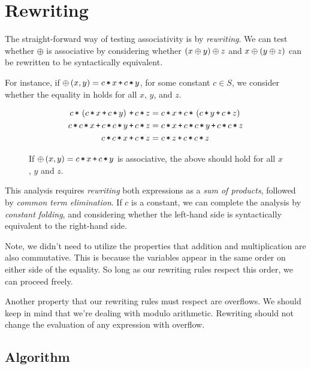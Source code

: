 
\section{Rewriting}

The straight-forward way of testing associativity is by \emph{rewriting}. We
can test whether $\oplus$ is associative by considering whether $\left({x \oplus y}\right)
\oplus z$ and $x \oplus \left({y \oplus z}\right)$ can be rewritten to be syntactically
equivalent.

For instance, if $\oplus\p{x,y} = c \lt x \lp c \lt y$, for some constant $c\in
S$, we consider whether the equality in  holds
for all $x$, $y$, and $z$.

\begin{figure*}[htbp!]
\begin{align*}
c \lt \p{c\lt x \lp c\lt y} \lp c \lt z &= c\lt x \lp c \lt \p{c\lt y \lp c\lt z} \\
c\lt c \lt x \lp c\lt c \lt y \lp c\lt z &= c\lt x \lp c\lt c \lt y \lp c\lt c \lt z \\
c\lt c \lt x \lp c\lt z &= c\lt z \lp c\lt c \lt z
\end{align*}
\caption[]{If $\oplus\p{x,y}=c\lt x \lp c\lt y$ is associative, the above
should hold for all $x$, $y$ and $z$.}
\label{figure:first-equality}
\end{figure*}

This analysis requires \emph{rewriting} both expressions as a \emph{sum of
products}, followed by \emph{common term elimination}. If $c$ is a constant, we
can complete the analysis by \emph{constant folding}, and considering whether
the left-hand side is syntactically equivalent to the right-hand side.

Note, we didn't need to utilize the properties that addition and multiplication
are also commutative.  This is because the variables appear in the same order
on either side of the equality. So long as our rewriting rules respect this
order, we can proceed freely. 

Another property that our rewriting rules must respect are overflows. We should
keep in mind that we're dealing with modulo arithmetic. Rewriting should not
change the evaluation of any expression with overflow.

\subsection{Algorithm}

